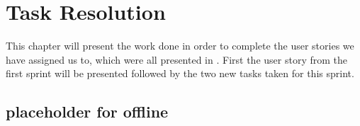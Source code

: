 \chapter{Task Resolution}
This chapter will present the work done in order to complete the user stories we have assigned us to, which were all presented in .
First the user story from the first sprint will be presented followed by the two new tasks taken for this sprint.
\section{placeholder for offline}
